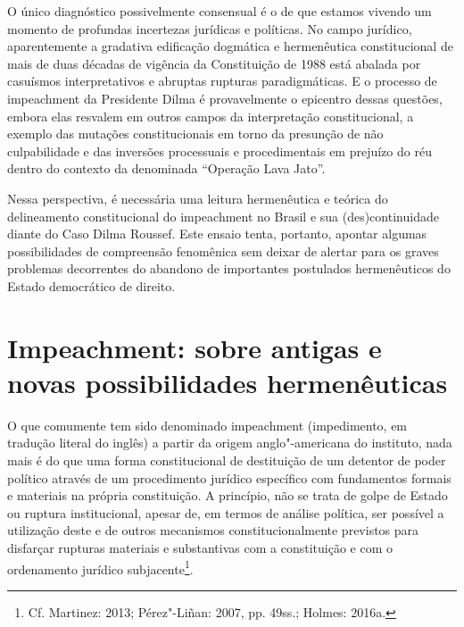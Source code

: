 O único diagnóstico possivelmente consensual é o de que estamos vivendo
um momento de profundas incertezas jurídicas e políticas. No campo
jurídico, aparentemente a gradativa edificação dogmática e hermenêutica
constitucional de mais de duas décadas de vigência da Constituição de
1988 está abalada por casuísmos interpretativos e abruptas rupturas
paradigmáticas. E o processo de impeachment da Presidente Dilma é
provavelmente o epicentro dessas questões, embora elas resvalem em
outros campos da interpretação constitucional, a exemplo das mutações
constitucionais em torno da presunção de não culpabilidade e das
inversões processuais e procedimentais em prejuízo do réu dentro do
contexto da denominada ``Operação Lava Jato''.

Nessa perspectiva, é necessária uma leitura hermenêutica e teórica do
delineamento constitucional do impeachment no Brasil e sua
(des)continuidade diante do Caso Dilma Roussef. Este ensaio tenta,
portanto, apontar algumas possibilidades de compreensão fenomênica sem
deixar de alertar para os graves problemas decorrentes do abandono de
importantes postulados hermenêuticos do Estado democrático de direito.

\section{Impeachment: sobre antigas e novas possibilidades
  hermenêuticas}

O que comumente tem sido denominado impeachment (impedimento, em
tradução literal do inglês) a partir da origem anglo"-americana do
instituto, nada mais é do que uma forma constitucional de destituição de
um detentor de poder político através de um procedimento jurídico
específico com fundamentos formais e materiais na própria constituição.
A princípio, não se trata de golpe de Estado ou ruptura institucional,
apesar de, em termos de análise política, ser possível a utilização
deste e de outros mecanismos constitucionalmente previstos para
disfarçar rupturas materiais e substantivas com a constituição e com o
ordenamento jurídico subjacente\footnote{Cf. Martinez: 2013; Pérez"-Liñan: 2007,
pp. 49ss.; Holmes: 2016a.}.

